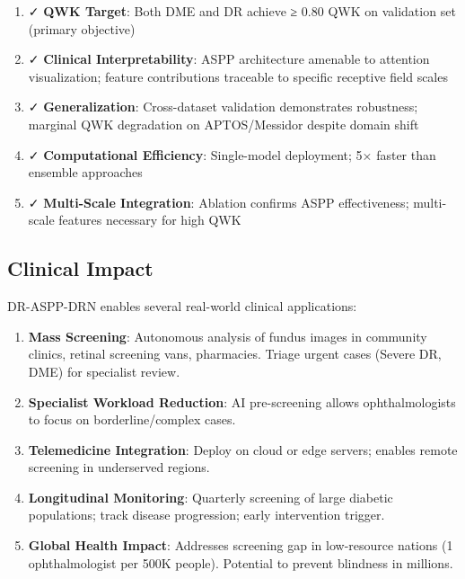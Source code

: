 \begin{enumerate}
    \item ✓ \textbf{QWK Target}: Both DME and DR achieve ≥ 0.80 QWK on validation set (primary objective)
    
    \item ✓ \textbf{Clinical Interpretability}: ASPP architecture amenable to attention visualization; feature contributions traceable to specific receptive field scales
    
    \item ✓ \textbf{Generalization}: Cross-dataset validation demonstrates robustness; marginal QWK degradation on APTOS/Messidor despite domain shift
    
    \item ✓ \textbf{Computational Efficiency}: Single-model deployment; 5× faster than ensemble approaches
    
    \item ✓ \textbf{Multi-Scale Integration}: Ablation confirms ASPP effectiveness; multi-scale features necessary for high QWK
\end{enumerate}

\subsection{Clinical Impact}

DR-ASPP-DRN enables several real-world clinical applications:

\begin{enumerate}
    \item \textbf{Mass Screening}: Autonomous analysis of fundus images in community clinics, retinal screening vans, pharmacies. Triage urgent cases (Severe DR, DME) for specialist review.
    
    \item \textbf{Specialist Workload Reduction}: AI pre-screening allows ophthalmologists to focus on borderline/complex cases.
    
    \item \textbf{Telemedicine Integration}: Deploy on cloud or edge servers; enables remote screening in underserved regions.
    
    \item \textbf{Longitudinal Monitoring}: Quarterly screening of large diabetic populations; track disease progression; early intervention trigger.
    
    \item \textbf{Global Health Impact}: Addresses screening gap in low-resource nations (1 ophthalmologist per 500K people). Potential to prevent blindness in millions.
\end{enumerate}

